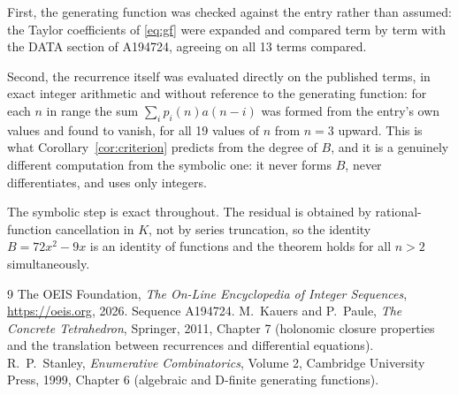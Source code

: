 \documentclass[11pt,a4paper]{article}
\theoremstyle{plain}
\theoremstyle{definition}
\begin{document}
First, the generating function was checked against the entry rather than assumed: the
Taylor coefficients of \eqref{eq:gf} were expanded and compared term by term with the DATA
section of A194724, agreeing on all 13 terms compared.

Second, the recurrence itself was evaluated directly on the published terms, in exact
integer arithmetic and without reference to the generating function: for each $n$ in range
the sum $\sum_{i}p_{i}(n)a(n-i)$ was formed from the entry's own values and found to
vanish, for all 19 values of $n$ from $n=3$ upward. This is what
Corollary~\ref{cor:criterion} predicts from the degree of $B$, and it is a genuinely
different computation from the symbolic one: it never forms $B$, never differentiates, and
uses only integers.

The symbolic step is exact throughout. The residual is obtained by rational-function
cancellation in $K$, not by series truncation, so the identity $B=72 x^{2} - 9 x$ is an
identity of functions and the theorem holds for all $n>2$ simultaneously.

\begin{thebibliography}{9}
 The OEIS Foundation, \emph{The On-Line Encyclopedia of Integer Sequences},
\url{https://oeis.org}, 2026. Sequence A194724.
 M.~Kauers and P.~Paule, \emph{The Concrete Tetrahedron}, Springer, 2011,
Chapter 7 (holonomic closure properties and the translation between recurrences and
differential equations).
 R.~P.~Stanley, \emph{Enumerative Combinatorics}, Volume 2, Cambridge
University Press, 1999, Chapter 6 (algebraic and D-finite generating functions).
\end{thebibliography}
\end{document}
